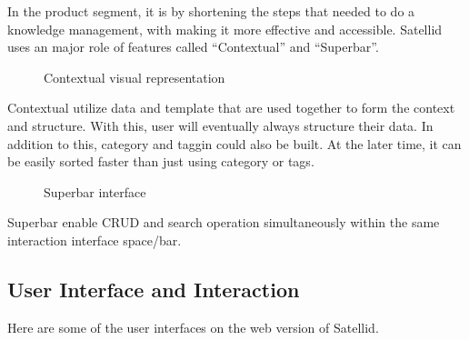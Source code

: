 In the product segment, it is by shortening the steps that needed to do a knowledge management, with making it more effective and accessible. Satellid uses an major role of features called ``Contextual'' and ``Superbar''.

\begin{figure}[htb]
    \centering
    \caption{Contextual visual representation}
    \label{fig:background:data-template}
\end{figure}

Contextual utilize data and template that are used together to form the context and structure.
With this, user will eventually always structure their data. In addition to this, category and taggin could also be built. At the later time, it can be easily sorted faster than just using category or tags.

\begin{figure}[htb]
    \centering
    \caption{Superbar interface}
    \label{fig:background:add-search}
\end{figure}

Superbar enable \ac{CRUD} and search operation simultaneously within the same interaction interface space/bar.

\subsection{User Interface and Interaction}

Here are some of the user interfaces on the web version of Satellid.
